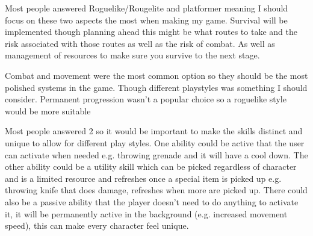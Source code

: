 \documentclass{article}
\newcommand{\parBr}{\vspace{5mm}}%
\begin{document}
Most people answered Roguelike/Rougelite and platformer meaning I should focus on these two aspects the most when making my game. Survival will be implemented though planning ahead this might be what routes to take and the risk associated with those routes as well as the risk of combat. As well as management of resources to make sure you survive to the next stage. 

 \linebreak
{}

\parBr

Combat and movement were the most common option so they should be the most polished systems in the game. Though different playstyles was something I should consider. Permanent progression wasn't a popular choice so a roguelike style would be more suitable 

 \linebreak
{}

\parBr

Most people answered 2 so it would be important to make the skills distinct and unique to allow for different play styles. One ability could be active that the user can activate when needed e.g. throwing grenade and it will have a cool down. The other ability could be a utility skill which can be picked regardless of character and is a limited resource and refreshes once a special item is picked up e.g. throwing knife that does damage, refreshes when more are picked up. There could also be a passive ability that the player doesn't need to do anything to activate it, it will be permanently active in the background (e.g. increased movement speed), this can make every character feel unique. 

 \linebreak
{}
\end{document}
